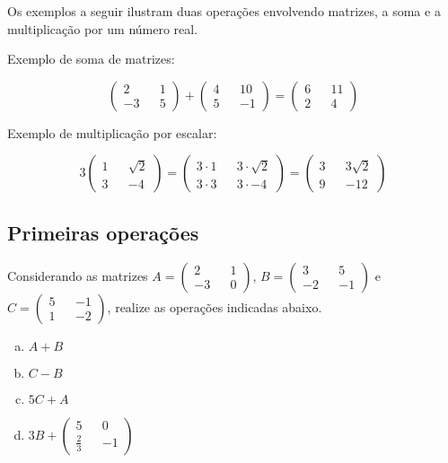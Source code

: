 \documentclass[main_estudante.tex]{subfiles}
\begin{document}
Os exemplos a seguir ilustram duas operações envolvendo matrizes, a soma e a multiplicação por um número real.

\begin{caixaExemplo}
	Exemplo de soma de matrizes:

  $$\begin{pmatrix} 2 && 1 \\ -3 && 5 \end{pmatrix} + \begin{pmatrix} 4 && 10 \\ 5 && -1 \end{pmatrix} = \begin{pmatrix} 6 && 11 \\ 2 && 4  \end{pmatrix}$$
\end{caixaExemplo} 	

\begin{caixaExemplo}
	Exemplo de multiplicação por escalar:
 
 $$3 \begin{pmatrix} 1 && \sqrt{2} \\ 3 && -4 \end{pmatrix} = \begin{pmatrix} 3 \cdot 1 && 3 \cdot \sqrt{2} \\ 3 \cdot 3 && 3 \cdot -4 \end{pmatrix} = \begin{pmatrix} 3 && 3 \sqrt{2} \\ 9 && -12 \end{pmatrix}$$
\end{caixaExemplo}


\subsection*{Primeiras operações}

\begin{questao}
Considerando as matrizes $A=\begin{pmatrix} 2 && 1 \\ -3 && 0 \end{pmatrix}$, $B=\begin{pmatrix} 3 && 5 \\ -2 && -1 \end{pmatrix}$ e $C=\begin{pmatrix} 5 && -1 \\ 1 && -2 \end{pmatrix}$, realize as operações indicadas abaixo.
\begin{enumerate}[a)]
\item $A+B$
\item $C-B$
\item $5C+A$
\item $3B+\begin{pmatrix} 5 && 0 \\ \frac{2}{3} && -1 \end{pmatrix}$
\end{enumerate}

\end{questao}
\end{document}
